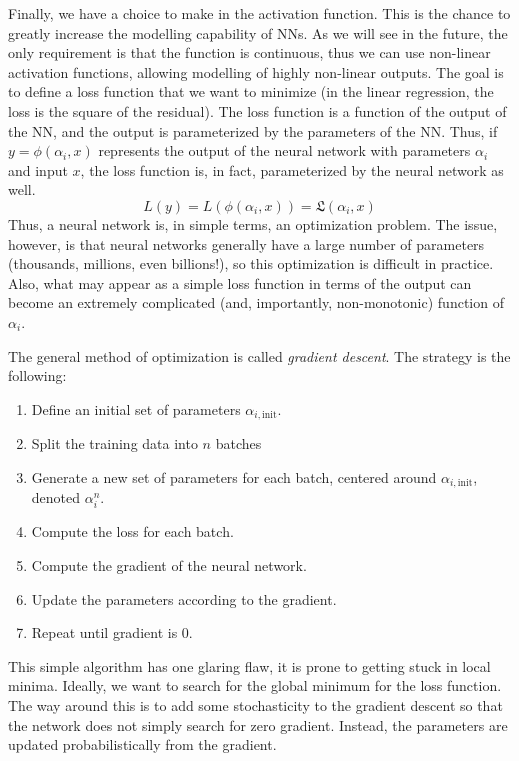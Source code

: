 Finally, we have a choice to make in the activation function. This is the chance to greatly increase the modelling capability of NNs. As we will see in the future, the only requirement is that the function is continuous, thus we can use non-linear activation functions, allowing modelling of highly non-linear outputs. The goal is to define a loss function that we want to minimize (in the linear regression, the loss is the square of the residual). The loss function is a function of the output of the NN, and the output is parameterized by the parameters of the NN. Thus, if $y=\phi(\alpha_i,x)$ represents the output of the neural network with parameters $\alpha_i$ and input $x$, the loss function is, in fact, parameterized by the neural network as well.
\begin{equation}
	L(y) = L(\phi(\alpha_i,x)) = \mathfrak{L}(\alpha_i,x)
\end{equation}
Thus, a neural network is, in simple terms, an optimization problem. The issue, however, is that neural networks generally have a large number of parameters (thousands, millions, even billions!), so this optimization is difficult in practice. Also, what may appear as a simple loss function in terms of the output can become an extremely complicated (and, importantly, non-monotonic) function of $\alpha_i$.

The general method of optimization is called \textit{gradient descent}. The strategy is the following:
\begin{enumerate}
	\item Define an initial set of parameters $\alpha_{i,\mathrm{init}}$.
	\item Split the training data into $n$ batches
	\item Generate a new set of parameters for each batch, centered around $\alpha_{i,\mathrm{init}}$, denoted $\alpha^{n}_{i}$.
	\item Compute the loss for each batch.
	\item Compute the gradient of the neural network.
	\item Update the parameters according to the gradient.
	\item Repeat until gradient is 0.
\end{enumerate}
This simple algorithm has one glaring flaw, it is prone to getting stuck in local minima. Ideally, we want to search for the global minimum for the loss function. The way around this is to add some stochasticity to the gradient descent so that the network does not simply search for zero gradient. Instead, the parameters are updated probabilistically from the gradient.

